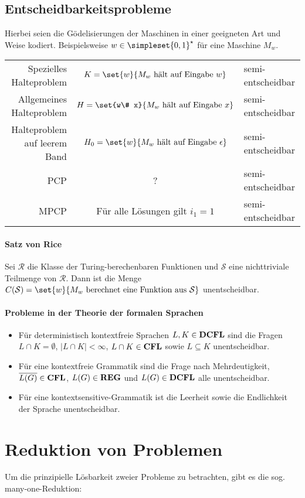 \subsection{Entscheidbarkeitsprobleme}
Hierbei seien die Gödelisierungen der Maschinen in einer geeigneten Art und Weise kodiert. Beispielsweise $w\in\simpleset{0,1}^\star$ für eine Maschine $M_w$.
\medskip

\begin{tabular}{r|c|l}
	Spezielles Halteproblem & $K=\set{w}{M_w \text{ hält auf Eingabe } w}$ & semi-entscheidbar\\
	Allgemeines Halteproblem & $H=\set{w\# x}{M_w \text{ hält auf Eingabe } x}$ & semi-entscheidbar\\
	Halteproblem auf leerem Band & $H_0=\set{w}{M_w \text{ hält auf Eingabe } \epsilon}$ & semi-entscheidbar\\
	PCP & ? & semi-entscheidbar\\
	MPCP & Für alle Lösungen gilt $i_1=1$ & semi-entscheidbar
\end{tabular}

\paragraph{Satz von Rice}
Sei $\mathcal R$ die Klasse der Turing-berechenbaren Funktionen und $\mathcal S$ eine nichttriviale Teilmenge von $\mathcal R$.
Dann ist die Menge $C(\mathcal S)=\set{w}{M_w \text{ berechnet eine Funktion aus } \mathcal S}$ unentscheidbar.

\paragraph{Probleme in der Theorie der formalen Sprachen}
\begin{itemize}
	\item Für deterministisch kontextfreie Sprachen $L,K\in\operatorname{\mathbf{DCFL}}$ sind die Fragen $L\cap K=\emptyset$, $|L\cap K|<\infty$, $L\cap K \in \operatorname{\mathbf{CFL}}$ sowie $L\subseteq K$ unentscheidbar.
	\item Für eine kontextfreie Grammatik sind die Frage nach Mehrdeutigkeit, $\overline{L(G)}\in\operatorname{\mathbf{CFL}}$, $L(G)\in \operatorname{\mathbf{REG}}$ und $L(G)\in \operatorname{\mathbf{DCFL}}$ alle unentscheidbar.
	\item Für eine kontextsensitive-Grammatik ist die Leerheit sowie die Endlichkeit der Sprache unentscheidbar.
\end{itemize}

\section{Reduktion von Problemen}
Um die prinzipielle Lösbarkeit zweier Probleme zu betrachten, gibt es die sog. many-one-Reduktion:

